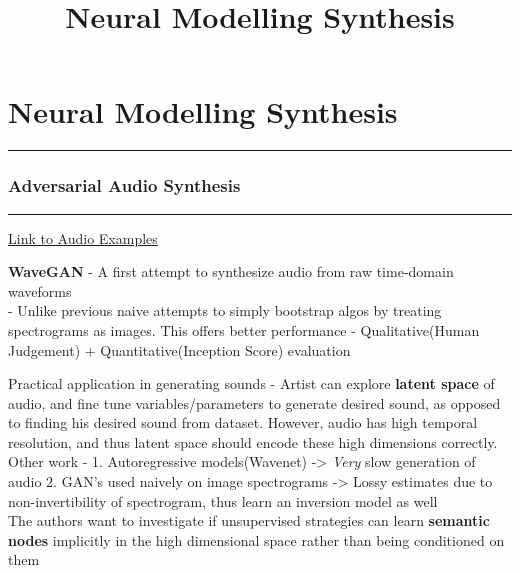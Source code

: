 \documentclass[11pt]{article}
\title{Neural Modelling Synthesis}
\begin{document}
    
    
    \maketitle
    
    

    
    \section{Neural Modelling Synthesis}\label{neural-modelling-synthesis}

\begin{center}\rule{0.5\linewidth}{\linethickness}\end{center}

    \subsubsection{Adversarial Audio
Synthesis}\label{adversarial-audio-synthesis}

\begin{center}\rule{0.5\linewidth}{\linethickness}\end{center}

\href{https://chrisdonahue.com/wavegan_examples/}{Link to Audio
Examples}

    \textbf{WaveGAN} - A first attempt to synthesize audio from raw
time-domain waveforms\\
- Unlike previous naive attempts to simply bootstrap algos by treating
spectrograms as images. This offers better performance -
Qualitative(Human Judgement) + Quantitative(Inception Score) evaluation

    Practical application in generating sounds - Artist can explore
\textbf{latent space} of audio, and fine tune variables/parameters to
generate desired sound, as opposed to finding his desired sound from
dataset. However, audio has high temporal resolution, and thus latent
space should encode these high dimensions correctly.\\
Other work - 1. Autoregressive models(Wavenet) -\textgreater{}
\emph{Very} slow generation of audio 2. GAN's used naively on image
spectrograms -\textgreater{} Lossy estimates due to non-invertibility of
spectrogram, thus learn an inversion model as well\\
The authors want to investigate if unsupervised strategies can learn
\textbf{semantic nodes} implicitly in the high dimensional space rather
than being conditioned on them
\end{document}

